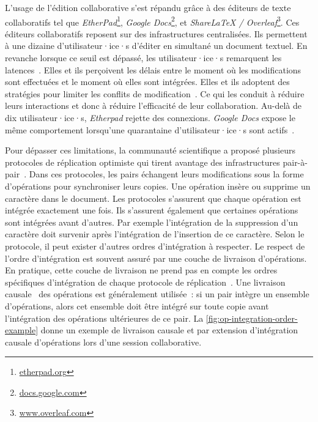 L'usage de l'édition collaborative s'est répandu grâce à des éditeurs de texte collaboratifs tel que \emph{EtherPad}\footnote{\href{https://etherpad.org}{etherpad.org}}, \emph{Google Docs}\footnote{\href{https://docs.google.com}{docs.google.com}}, et \emph{ShareLaTeX / Overleaf}\footnote{\href{https://www.overleaf.com}{www.overleaf.com}}.
Ces éditeurs collaboratifs reposent sur des infrastructures centralisées.
Ils permettent à une dizaine d'utilisateur·ice·s d'éditer en simultané un document textuel.
En revanche lorsque ce seuil est dépassé, les utilisateur·ice·s remarquent les latences~\autocite{dang2016performance}.
Elles et ils perçoivent les délais entre le moment où les modifications sont effectuées et le moment où elles sont intégrées.
Elles et ils adoptent des stratégies pour limiter les conflits de modification~\autocite{ignat_2015_user-and-delay,ignat2014_delayeffect}.
Ce qui les conduit à réduire leurs interactions et donc à réduire l'efficacité de leur collaboration.
Au-delà de dix utilisateur·ice·s, \emph{Etherpad} rejette des connexions.
\emph{Google Docs} expose le même comportement lorsqu'une quarantaine d'utilisateur·ice·s sont actifs~\autocite{dang2016performance}.

Pour dépasser ces limitations, la communauté scientifique a proposé plusieurs protocoles de réplication optimiste qui tirent avantage des infrastructures pair-à-pair~\autocite{ahmednacer2011evaluatingcrdts,oster_2006_woot,preguica_2009_treedoc,weiss2010logoot,roh_2011_rga,andre_2013_logootsplit,nicolaescu2015yjs,briot_2016_rgasplit}.
Dans ces protocoles, les pairs échangent leurs modifications sous la forme d'opérations pour synchroniser leurs copies.
Une opération insère ou supprime un caractère dans le document.
Les protocoles s'assurent que chaque opération est intégrée exactement une fois.
Ils s'assurent également que certaines opérations sont intégrées avant d'autres.
Par exemple l'intégration de la suppression d'un caractère doit survenir après l'intégration de l'insertion de ce caractère.
Selon le protocole, il peut exister d'autres ordres d'intégration à respecter.
Le respect de l'ordre d'intégration est souvent assuré par une couche de livraison d'opérations.
En pratique, cette couche de livraison ne prend pas en compte les ordres spécifiques d'intégration de chaque protocole de réplication~\autocite{shapiro_2011_crdt,shapiro2011_comprehensive}.
Une livraison causale~\autocite{prakash_1997_barrierbarrier} des opérations est généralement utilisée~: si un pair intègre un ensemble d'opérations, alors cet ensemble doit être intégré sur toute copie avant l'intégration des opérations ultérieures de ce pair.
La \autoref{fig:op-integration-order-example} donne un exemple de livraison causale et par extension d'intégration causale d'opérations lors d'une session collaborative.

